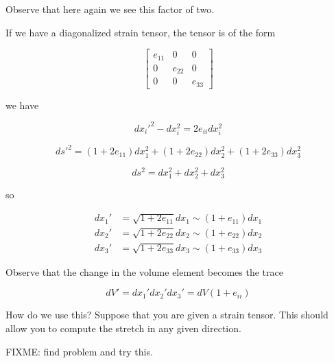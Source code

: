 Observe that here again we see this factor of two.

If we have a diagonalized strain tensor, the tensor is of the form

\begin{equation}\label{eqn:continuumL3:110}
\begin{bmatrix}
e_{11} & 0 & 0 \\
0 & e_{22} & 0 \\
0 & 0 & e_{33} 
\end{bmatrix}
\end{equation}

we have

\begin{equation}\label{eqn:continuumL3:130}
{dx_i'}^2 - dx_i^2 = 2 e_{ii} dx_i^2
\end{equation}

\begin{equation}\label{eqn:continuumL3:150}
{ds'}^2 = 
(1 + 2 e_{11}) dx_1^2
+(1 + 2 e_{22}) dx_2^2
+(1 + 2 e_{33}) dx_3^2
\end{equation}

\begin{equation}\label{eqn:continuumL3:170}
ds^2 = 
dx_1^2
+dx_2^2
+dx_3^2
\end{equation}

so 

\begin{align}\label{eqn:continuumL3:190}
dx_1' &= \sqrt{1 + 2 e_{11}} dx_1 \sim ( 1 + e_{11}) dx_1 \\
dx_2' &= \sqrt{1 + 2 e_{22}} dx_2 \sim ( 1 + e_{22}) dx_2 \\
dx_3' &= \sqrt{1 + 2 e_{33}} dx_3 \sim ( 1 + e_{33}) dx_3
\end{align}

Observe that the change in the volume element becomes the trace

\begin{equation}\label{eqn:continuumL3:210}
dV' = 
dx_1'
dx_2'
dx_3'
= dV(1 + e_{ii})
\end{equation}

How do we use this?  Suppose that you are given a strain tensor.  This should allow you to compute the stretch in any given direction.

FIXME: find problem and try this.
